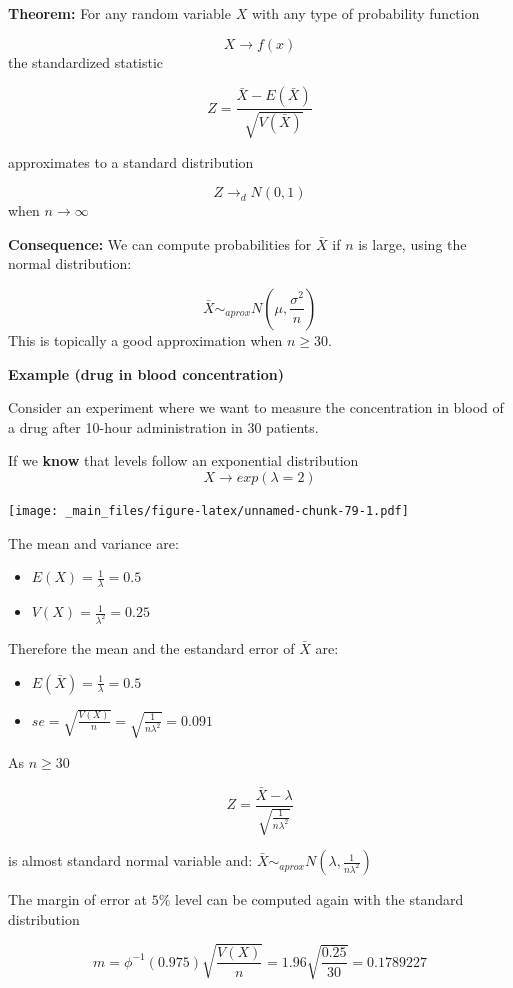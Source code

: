 \documentclass[
]{book}
\providecommand{\tightlist}{%
  \setlength{\itemsep}{0pt}\setlength{\parskip}{0pt}}
\begin{document}
\textbf{Theorem:} For any random variable \(X\) with any type of probability function

\[X \rightarrow f(x)\]
the standardized statistic

\[Z=\frac{\bar{X}-E(\bar{X})}{\sqrt{V(\bar{X})}}\]

approximates to a standard distribution

\[Z \rightarrow_d N(0,1)\] when \(n\rightarrow \infty\)

\textbf{Consequence:} We can compute probabilities for \(\bar{X}\) if \(n\) is large, using the normal distribution:

\[\bar{X} \sim_{aprox}  N(\mu, \frac{\sigma^2}{n})\]
This is topically a good approximation when \(n\geq 30\).

\textbf{Example (drug in blood concentration)}

Consider an experiment where we want to measure the concentration in blood of a drug after 10-hour administration in \(30\) patients.

If we \textbf{know} that levels follow an exponential distribution \[X \rightarrow exp(\lambda=2)\]

\texttt{[image: \_main\_files/figure-latex/unnamed-chunk-79-1.pdf]}

The mean and variance are:

\begin{itemize}
\tightlist
\item
  \(E(X)=\frac{1}{\lambda}=0.5\)
\item
  \(V(X)=\frac{1}{\lambda^2}=0.25\)
\end{itemize}

Therefore the mean and the estandard error of \(\bar{X}\) are:

\begin{itemize}
\tightlist
\item
  \(E(\bar{X})=\frac{1}{\lambda}=0.5\)
\item
  \(se=\sqrt{\frac{V(X)}{n}}=\sqrt{\frac{1}{n\lambda^2}}=0.091\)
\end{itemize}

As \(n \geq 30\)

\[Z=\frac{\bar{X}-\lambda}{\sqrt{\frac{1}{n\lambda^2}}}\]

is almost standard normal variable and: \(\bar{X} \sim_{aprox} N(\lambda, \frac{1}{n\lambda^2})\)

The margin of error at \(5\%\) level can be computed again with the standard distribution

\[m=\phi^{-1}(0.975) \sqrt{\frac{V(X)}{n}}=1.96\sqrt{\frac{0.25}{30}}=0.1789227\]
\end{document}
